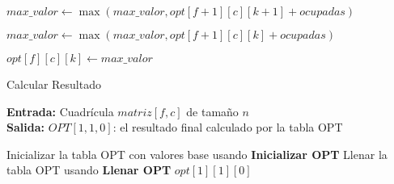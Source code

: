 \begin{algorithm}
\begin{algorithmic}[1]
                     
                        \State $max\_valor \gets \max(max\_valor, opt[f + 1][c][k + 1] + ocupadas)$
                    \EndIf

                     
                        \State $max\_valor \gets \max(max\_valor, opt[f + 1][c][k] + ocupadas)$
                    \EndIf

                    \State $opt[f][c][k] \gets max\_valor$ 
                \EndFor
            \EndFor
        \EndFor
    \end{algorithmic}
\end{algorithm}

\begin{algorithm}
    \caption{Calcular Resultado}
    \label{alg:calcularResultado}
    \textbf{Entrada:} Cuadrícula $matriz[f, c]$ de tamaño $n$ \\
    \textbf{Salida:} $OPT[1, 1, 0]$: el resultado final calculado por la tabla OPT

    \begin{algorithmic}[1]
        \State Inicializar la tabla OPT con valores base usando \textbf{Inicializar OPT}
        \State Llenar la tabla OPT usando \textbf{Llenar OPT}
        \State \Return $opt[1][1][0]$
    \end{algorithmic}
\end{algorithm}

\newpage
